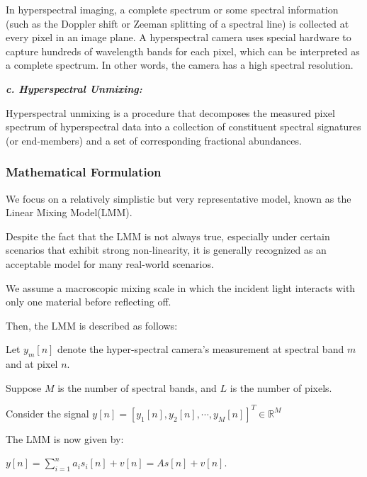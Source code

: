 \documentclass[fleqn, 11pt]{article}
\newcommand{\R}[0]{\mathbb{R}}
\begin{document}
In hyperspectral imaging, a complete spectrum or some spectral information (such as the Doppler shift or Zeeman splitting of a spectral line) is collected at every pixel in an image plane. A hyperspectral camera uses special hardware to capture hundreds of wavelength bands for each pixel, which can be interpreted as a complete spectrum. In other words, the camera has a high spectral resolution.

\medskip

\textbf{\textit{c. Hyperspectral Unmixing:}}

\smallskip

Hyperspectral unmixing is
a procedure that decomposes the measured pixel spectrum
of hyperspectral data into a collection of constituent spectral
signatures (or end-members) and a set of corresponding fractional abundances.

\subsubsection*{Mathematical Formulation}

We focus on a relatively simplistic but very representative
model, known as the Linear Mixing Model(LMM). 

\smallskip

Despite the fact that the LMM is not always true, 
especially under certain scenarios that exhibit strong non-linearity, 
it is generally recognized as an acceptable model 
for many real-world scenarios.

\smallskip

We assume a
macroscopic mixing scale in which the incident light interacts
with only one material before reflecting off.

\medskip

Then, the LMM is described as follows:

\smallskip

Let $y_m[n]$ denote the
hyper-spectral camera’s measurement at spectral band $m$ and at pixel $n$. 

\smallskip

Suppose $M$ is the number of spectral bands, and $L$ is the number of pixels. 

\smallskip

Consider the signal $y[n] = [ y_1[n], y_2[n], \cdots , y_M[n]  ]^T \in \R^M$

\newpage

The LMM is now given by: 

\begin{center}
    $y[n] = \displaystyle \sum_{i=1}^n a_i s_i[n] + v[n] = As[n] + v[n] $.
\end{center}
\end{document}
